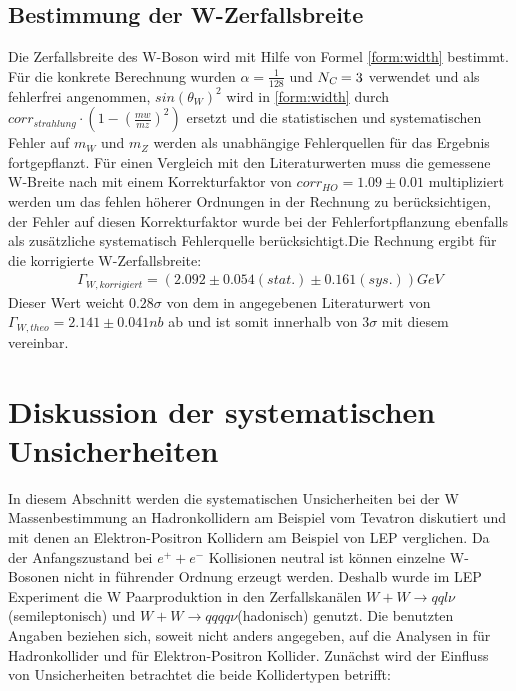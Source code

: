 \documentclass[a4paper,12pt]{article}
\begin{document}
\subsection{Bestimmung der W-Zerfallsbreite}
Die Zerfallsbreite des W-Boson wird mit Hilfe von Formel \ref{form:width} bestimmt. Für die konkrete Berechnung
wurden $\alpha = \frac{1}{128}$ und $N_{\textsl{C}}=3$ verwendet und als fehlerfrei angenommen, $sin(\theta_{W})^{2} $
wird in \ref{form:width} durch $corr_{strahlung}\cdot(1-(\frac{mw}{mz})^{2})$ ersetzt und die statistischen und
systematischen Fehler auf $m_{W}$ und $m_{Z}$ werden als unabhängige Fehlerquellen für das Ergebnis fortgepflanzt. Für 
einen Vergleich mit den Literaturwerten muss die gemessene W-Breite nach \cite{versuchsanleitung} mit einem Korrekturfaktor
von $corr_{HO}=1.09 \pm 0.01$ multipliziert werden um das fehlen höherer Ordnungen in der Rechnung zu berücksichtigen, der
Fehler auf diesen Korrekturfaktor wurde bei der Fehlerfortpflanzung ebenfalls als zusätzliche systematisch Fehlerquelle
berücksichtigt.Die Rechnung ergibt für die korrigierte W-Zerfallsbreite:
\begin{align*}
	Γ_{W,korrigiert} = ( 2.092 ± 0.054 (stat.) ± 0.161(sys.)) \si{GeV}
\end{align*}
Dieser Wert weicht $0.28\sigma$ von dem in \cite{versuchsanleitung} angegebenen Literaturwert von $Γ_{W,theo} = 2.141 \pm 0.041\si{nb}$
ab und ist somit innerhalb von $3\sigma$ mit diesem vereinbar.

\newpage
\section{Diskussion der systematischen Unsicherheiten}
In diesem Abschnitt werden die systematischen Unsicherheiten bei der W Massenbestimmung an Hadronkollidern am Beispiel vom Tevatron diskutiert
und mit denen an Elektron-Positron Kollidern am Beispiel von LEP verglichen. Da der Anfangszustand bei $e^{+}+e^{-}$ Kollisionen neutral ist können einzelne W-Bosonen
nicht in führender Ordnung erzeugt werden. Deshalb wurde im LEP Experiment die W Paarproduktion in den \cite{Achard:2005qy}
Zerfallskanälen $W+W \rightarrow qql\nu$ (semileptonisch) und $W+W \rightarrow qqqq\nu$(hadonisch) genutzt.
Die benutzten Angaben beziehen sich, soweit nicht anders angegeben, auf die Analysen in
\cite{Abachi:1996ey} für Hadronkollider und \cite{Achard:2005qy} für Elektron-Positron Kollider. Zunächst wird der Einfluss von Unsicherheiten
betrachtet die beide Kollidertypen betrifft: 
\end{document}
